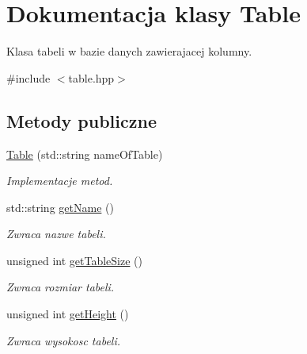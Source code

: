 \hypertarget{class_table}{}\section{Dokumentacja klasy Table}
\label{class_table}


Klasa tabeli w bazie danych zawierajacej kolumny.  




{\ttfamily \#include $<$table.\+hpp$>$}

\subsection*{Metody publiczne}
\begin{DoxyCompactItemize}
\item 
\mbox{\hyperlink{class_table_a13c865a29586d5b4b17518ea08b9bb17}{Table}} (std\+::string name\+Of\+Table)
\begin{DoxyCompactList}\small\item\em Implementacje metod. \end{DoxyCompactList}\item 
\mbox{\label{class_table_a3a6049ceab7c12f75252590c8a3521df}} 
std\+::string \mbox{\hyperlink{class_table_a3a6049ceab7c12f75252590c8a3521df}{get\+Name}} ()
\begin{DoxyCompactList}\small\item\em Zwraca nazwe tabeli. \end{DoxyCompactList}\item 
\mbox{\label{class_table_a440a486d84477d646ef7c570c06fa1a6}} 
unsigned int \mbox{\hyperlink{class_table_a440a486d84477d646ef7c570c06fa1a6}{get\+Table\+Size}} ()
\begin{DoxyCompactList}\small\item\em Zwraca rozmiar tabeli. \end{DoxyCompactList}\item 
\mbox{\label{class_table_ae2cf6b2e397a0cc4ff6fea6b4c54e363}} 
unsigned int \mbox{\hyperlink{class_table_ae2cf6b2e397a0cc4ff6fea6b4c54e363}{get\+Height}} ()
\begin{DoxyCompactList}\small\item\em Zwraca wysokosc tabeli. \end{DoxyCompactList}\item 
\mbox{\label{class_table_a9142623a172710464598aaa309ebd54d}} 

\end{DoxyCompactItemize}
